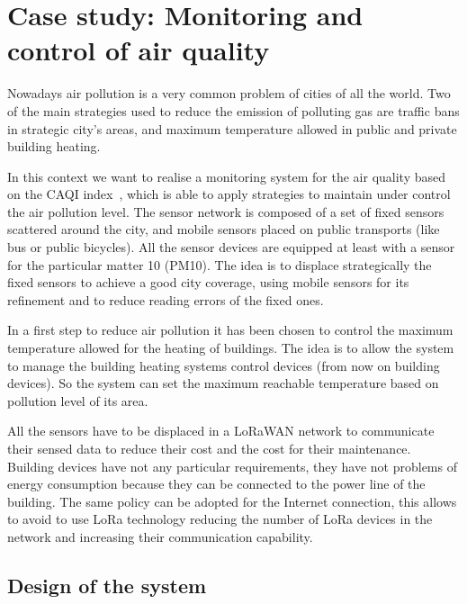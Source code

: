 \section{Case study: Monitoring and control of air quality}

\label{sec:case-staudyAC}


Nowadays air pollution is a very common problem of cities of all the world.
Two of the main strategies used to reduce the emission of polluting gas are traffic bans in strategic city's areas, and maximum temperature allowed in public and private building heating.

In this context we want to realise a monitoring system for the air quality based on the CAQI index~\cite{CAQI}, which is able to apply strategies to maintain under control the air pollution level.
The sensor network is composed of a set of fixed sensors scattered around the city, and mobile sensors placed on public transports (like bus or public bicycles).
All the sensor devices are equipped at least with a sensor for the particular matter 10 (PM10).
The idea is to displace strategically the fixed sensors to achieve a good city coverage, using mobile sensors for its refinement and to reduce reading errors of the fixed ones.

In a first step to reduce air pollution it has been chosen to control the maximum temperature allowed for the heating of buildings.
The idea is to allow the system to manage the building heating systems control devices (from now on building devices). So the system can set the maximum reachable temperature based on pollution level of its area.

All the sensors have to be displaced in a LoRaWAN network to communicate their sensed data to reduce their cost and the cost for their maintenance. 
Building devices have not any particular requirements, they have not problems of energy consumption because they can be connected to the power line of the building.
The same policy can be adopted for the Internet connection, this allows to avoid to use LoRa technology reducing the number of LoRa devices in the network and increasing their communication capability.

\subsection{Design of the system}


